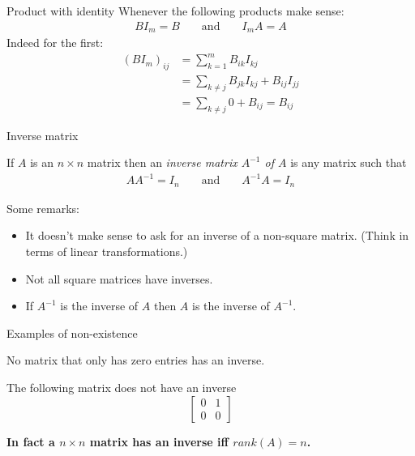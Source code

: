 \documentclass{beamer}
\begin{document}
\begin{frame}{Product with identity}
  Whenever the following products make sense:
  \begin{align*}
    BI_m = B & & \text{ and } & & I_mA = A
  \end{align*}
  Indeed for the first:
  \begin{align*}
    (BI_m)_{ij} &= \sum_{k=1}^mB_{ik}I_{kj}\\
                &= \sum_{k\neq j}B_{jk}I_{kj} + B_{ij}I_{jj}\\
                &= \sum_{k\neq j}0 + B_{ij} = B_{ij}
  \end{align*}
\end{frame}

\begin{frame}{Inverse matrix}
  \begin{definition}
    If $A$ is an $n\times n$ matrix then an \emph{inverse matrix $A^{-1}$ of $A$} is any matrix such that
    \begin{align*}
     AA^{-1} = I_n & & \text{ and } & & A^{-1}A = I_n
    \end{align*}
  \end{definition}\vfill
  {\color{red}Some remarks:}
  \begin{itemize}
  \item It doesn't make sense to ask for an inverse of a non-square matrix.
    (Think in terms of linear transformations.)
  \item Not all square matrices have inverses.
  \item If $A^{-1}$ is the inverse of $A$ then $A$ is the inverse of $A^{-1}$.
  \end{itemize}
\end{frame}

\begin{frame}{Examples of non-existence}
  \begin{example}
    No matrix that only has zero entries has an inverse.
  \end{example}
  \begin{example}
    The following matrix does not have an inverse
    \begin{equation*}
      \left[
	\begin{array}{cc}
          0 & 1 \\
          0 & 0
	\end{array}
      \right]
    \end{equation*}
  \end{example}
  \bf{In fact a $n\times n$ matrix has an inverse iff $rank(A)=n$.}
\end{frame}
\end{document}
